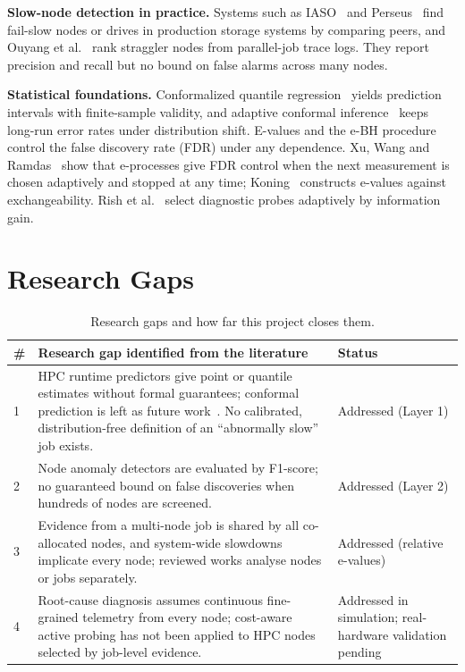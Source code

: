 \documentclass[10pt,a4paper]{article}
\begin{document}
\textbf{Slow-node detection in practice.} Systems such as IASO~\cite{iaso} and Perseus~\cite{perseus} find fail-slow nodes or drives in production storage systems by comparing peers, and Ouyang et al.~\cite{ouyang} rank straggler nodes from parallel-job trace logs. They report precision and recall but no bound on false alarms across many nodes.

\textbf{Statistical foundations.} Conformalized quantile regression~\cite{cqr} yields prediction intervals with finite-sample validity, and adaptive conformal inference~\cite{aci} keeps long-run error rates under distribution shift. E-values and the e-BH procedure~\cite{ebh} control the false discovery rate (FDR) under any dependence. Xu, Wang and Ramdas~\cite{xu2021} show that e-processes give FDR control when the next measurement is chosen adaptively and stopped at any time; Koning~\cite{koning} constructs e-values against exchangeability. Rish et al.~\cite{rish} select diagnostic probes adaptively by information gain.

\section{Research Gaps}
\begin{table}[H]
\centering
\caption{Research gaps and how far this project closes them.}
\label{tab:gaps}
\small
\begin{tabularx}{\textwidth}{@{}lXl@{}}
\toprule
\# & Research gap identified from the literature & Status \\
\midrule
1 & HPC runtime predictors give point or quantile estimates without formal guarantees; conformal prediction is left as future work~\cite{uarp}. No calibrated, distribution-free definition of an ``abnormally slow'' job exists. & Addressed (Layer 1)\\
2 & Node anomaly detectors are evaluated by F1-score; no guaranteed bound on false discoveries when hundreds of nodes are screened. & Addressed (Layer 2)\\
3 & Evidence from a multi-node job is shared by all co-allocated nodes, and system-wide slowdowns implicate every node; reviewed works analyse nodes or jobs separately. & Addressed (relative e-values)\\
4 & Root-cause diagnosis assumes continuous fine-grained telemetry from every node; cost-aware active probing has not been applied to HPC nodes selected by job-level evidence. & Addressed in simulation; real-hardware validation pending\\
\bottomrule
\end{tabularx}
\end{table}
\end{document}
